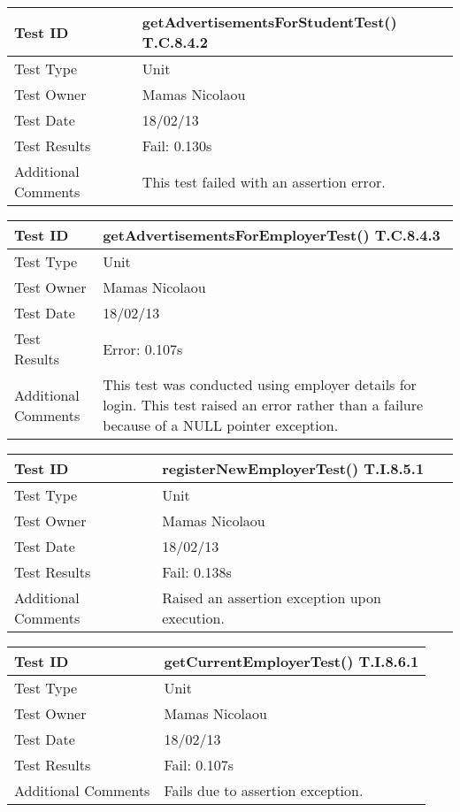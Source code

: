 \documentclass{l3deliverable}
\begin{document}
\begin{tabular}{|p{2cm}|p{12cm}|}
\hline
Test ID & getAdvertisementsForStudentTest() T.C.8.4.2\\
\hline
Test Type & Unit\\
\hline
Test Owner  & Mamas Nicolaou\\
\hline
Test Date & 18/02/13\\
\hline
Test Results & Fail: 0.130s\\
\hline
Additional Comments & This test failed with an assertion error.\\
\hline
\end{tabular}

\vspace{4 mm}

\begin{tabular}{|p{2cm}|p{12cm}|}
\hline
Test ID & getAdvertisementsForEmployerTest() T.C.8.4.3\\
\hline
Test Type & Unit\\
\hline
Test Owner  & Mamas Nicolaou\\
\hline
Test Date & 18/02/13\\
\hline
Test Results & Error: 0.107s\\
\hline
Additional Comments & This test was conducted using employer details for login. This test raised an error rather than a failure because of a NULL pointer exception.\\
\hline
\end{tabular}

\vspace{4 mm}

\begin{tabular}{|p{2cm}|p{12cm}|}
\hline
Test ID & registerNewEmployerTest() T.I.8.5.1\\
\hline
Test Type & Unit\\
\hline
Test Owner  & Mamas Nicolaou\\
\hline
Test Date & 18/02/13\\
\hline
Test Results & Fail: 0.138s\\
\hline
Additional Comments & Raised an assertion exception upon execution.\\
\hline
\end{tabular}

\vspace{4 mm}

\begin{tabular}{|p{2cm}|p{12cm}|}
\hline
Test ID & getCurrentEmployerTest() T.I.8.6.1\\
\hline
Test Type & Unit\\
\hline
Test Owner  & Mamas Nicolaou\\
\hline
Test Date & 18/02/13\\
\hline
Test Results & Fail: 0.107s\\
\hline
Additional Comments & Fails due to assertion exception.\\
\hline
\end{tabular}
\end{document}
